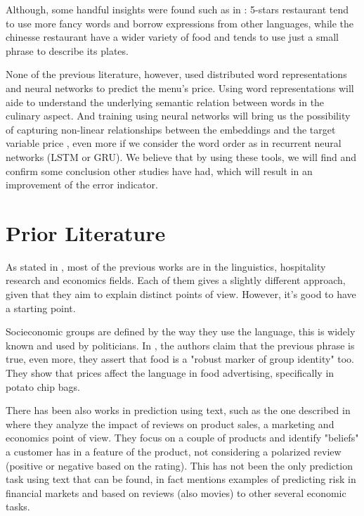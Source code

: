 \documentclass[11pt,letterpaper]{article}
\begin{document}
Although, some handful insights were found such as in \cite{chahuneau2012word,jurafsky2014language,jurafsky2016bordieu}: 5-stars restaurant tend to use more fancy words and borrow expressions from other languages, while the chinesse restaurant have a wider variety of food and tends to use just a small phrase to describe its plates. 

None of the previous literature, however, used distributed word representations and neural networks to predict the menu's price. Using word representations will aide to understand the underlying semantic relation between words \cite{mikolov2013efficient} in the culinary aspect. And training using neural networks will bring us the possibility of capturing non-linear relationships between the embeddings and the target variable price \cite{}, even more if we consider the word order as in recurrent neural networks (LSTM or GRU). We believe that by using these tools, we will find and confirm some conclusion other studies have had, which will  result in an improvement of the error indicator. 


\section{Prior Literature}

As stated in \cite{chahuneau2012word}, most of the previous works are in the linguistics, hospitality research and economics fields. Each of them gives a slightly different approach, given that they aim to explain distinct points of view. However, it's good to have a starting point.

Socieconomic groups are defined by the way they use the language, this is widely known and used by politicians. In \cite{freedman2011authenticity}, the authors claim that the previous phrase is true, even more, they assert that food is a "robust marker of group identity" too. They show that prices affect the language in food advertising, specifically in potato chip bags. 

There has been also works in prediction using text, such as the one described in \cite{archak2011deriving} where they analyze the impact of reviews on product sales, a marketing and economics point of view. They focus on a couple of products and identify "beliefs" a customer has in a feature of the product, not considering a polarized review (positive or negative based on the rating). This has not been the only prediction task using text that can be found, in fact \cite{chahuneau2012word} mentions examples of predicting risk in financial markets and based on reviews (also movies) to other several economic tasks. 
\end{document}
